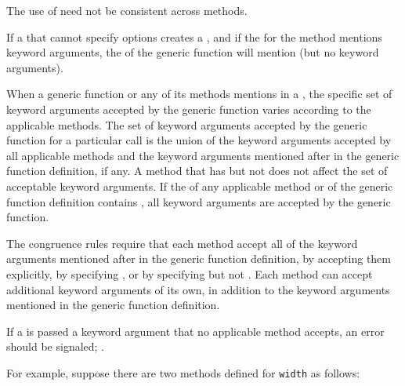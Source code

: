  The use of  need not be consistent across methods.

If a  that cannot specify  options
creates a , and if the  for the method
mentions keyword arguments, the  of the generic function
will mention  (but no keyword arguments).

\endlist

\endSubsection%


                                                        
When a generic function or any of its methods mentions 
 in a , the specific set of keyword
arguments accepted by the generic function varies according to the
applicable methods.  The set of keyword arguments accepted by the
generic function for a particular call is the union of the keyword
arguments accepted by all applicable methods and the keyword arguments
mentioned after  in the generic function definition,
if any.  A method that has  but not  does not affect the
set of acceptable keyword arguments.  If
the  of any applicable method or of the generic
function definition contains , all
keyword arguments are accepted by the generic function.

The  congruence rules require that each method
accept all of the keyword arguments mentioned after  in the
generic function definition, by accepting them explicitly, by
specifying , or by specifying  but
not .  Each method can accept additional keyword arguments
of its own, in addition to the keyword arguments mentioned in the
generic function definition.

If a  is passed a keyword argument that no applicable
method accepts, an error should be signaled; \seesection\FuncallErrorChecking.


For example, suppose there are two methods defined for {\tt width}
as follows:

